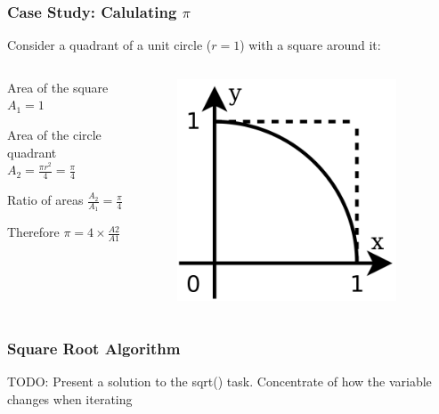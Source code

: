 \documentclass[14pt]{beamer}
\begin{document}
\begin{frame}
\frametitle{Case Study: Calulating $\pi$}
Consider a quadrant of a unit circle ($r=1$) with a square around it:
\begin{columns}
\begin{column}{0.5\textwidth}
\begin{itemize}
\small{
\item Area of the square $A_1 = 1$\\
\item Area of the circle quadrant $A_2 =\frac{\pi r^2}{4} = \frac{\pi}{4}$ \\
\item Ratio of areas $\frac{A_2}{A_1} = \frac{\pi}{4}$
\item Therefore $\pi = 4\times \frac{A2}{A1}$
}
\end{itemize}
\end{column}
\begin{column}{0.5\textwidth}
\begin{figure}
\includegraphics[width=0.9\textwidth]{pi.png}
\end{figure}
\end{column}
\end{columns}
\end{frame}

\begin{frame}
\frametitle{Square Root Algorithm}
TODO: Present a solution to the sqrt() task.
Concentrate of how the variable changes when iterating
\end{frame}
\end{document}
